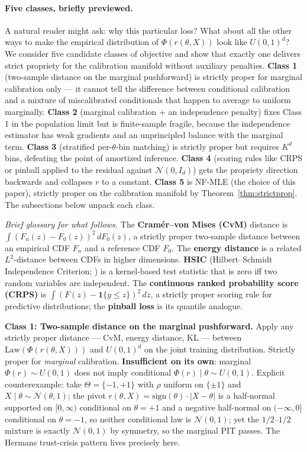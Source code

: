 \documentclass[11pt]{article}
\begin{document}
\paragraph{Five classes, briefly previewed.}
A natural reader might ask: why this particular loss? What about all
the other ways to make the empirical distribution of \(\Phi(r(\theta, X))\)
look like \(U(0, 1)^d\)? We consider five candidate classes of
objective and show that exactly one delivers strict propriety for the
calibration manifold without auxiliary penalties. \textbf{Class 1}
(two-sample distance on the marginal pushforward) is strictly proper
for marginal calibration only --- it cannot tell the difference between
conditional calibration and a mixture of miscalibrated conditionals
that happen to average to uniform marginally. \textbf{Class 2}
(marginal calibration + an independence penalty) fixes Class 1 in the
population limit but is finite-sample fragile, because the independence
estimator has weak gradients and an unprincipled balance with the
marginal term. \textbf{Class 3} (stratified per-\(\theta\)-bin matching)
is strictly proper but requires \(K^d\) bins, defeating the point of
amortized inference. \textbf{Class 4} (scoring rules like CRPS or
pinball applied to the residual against \(\mathcal{N}(0, I_d)\)) gets
the propriety direction backwards and collapses \(r\) to a constant.
\textbf{Class 5} is NF-MLE (the choice of this paper), strictly proper
on the calibration manifold by Theorem~\ref{thm:strictprop}. The
subsections below unpack each class.

\emph{Brief glossary for what follows.} The \textbf{Cramér--von Mises
(CvM)} distance is \(\int (F_n(z) - F_0(z))^2\, dF_0(z)\), a strictly
proper two-sample distance between an empirical CDF \(F_n\) and a
reference CDF \(F_0\). The \textbf{energy distance} is a related
\(L^2\)-distance between CDFs in higher dimensions. \textbf{HSIC}
(Hilbert--Schmidt Independence Criterion; \citealp{GrettonEtAl2005}) is
a kernel-based test statistic that is zero iff two random variables are
independent. The \textbf{continuous ranked probability score (CRPS)} is
\(\int(F(z) - \mathbf{1}\{y \le z\})^2\,dz\), a strictly proper scoring
rule for predictive distributions; the \textbf{pinball loss} is its
quantile analogue.

\textbf{Class 1: Two-sample distance on the marginal pushforward.} Apply
any strictly proper distance --- CvM, energy distance, KL --- between
\(\mathrm{Law}(\Phi(r(\theta, X)))\) and \(U(0,1)^d\) on the joint
training distribution. Strictly proper for \emph{marginal} calibration.
\textbf{Insufficient on its own}: marginal \(\Phi(r) \sim U(0,1)\) does
not imply conditional \(\Phi(r) \mid \theta \sim U(0,1)\). Explicit
counterexample: take \(\Theta = \{-1, +1\}\) with \(\rho\) uniform on
\(\{\pm 1\}\) and \(X \mid \theta \sim \mathcal{N}(\theta, 1)\); the
pivot \(r(\theta, X) = \mathrm{sign}(\theta)\cdot |X - \theta|\) is a
half-normal supported on \([0, \infty)\) conditional on \(\theta = +1\)
and a negative half-normal on \((-\infty, 0]\) conditional on
\(\theta = -1\), so neither conditional law is \(\mathcal{N}(0,1)\); yet
the \(1/2\)--\(1/2\) mixture is exactly \(\mathcal{N}(0,1)\) by
symmetry, so the marginal PIT passes. The Hermans trust-crisis pattern
lives precisely here.
\end{document}
